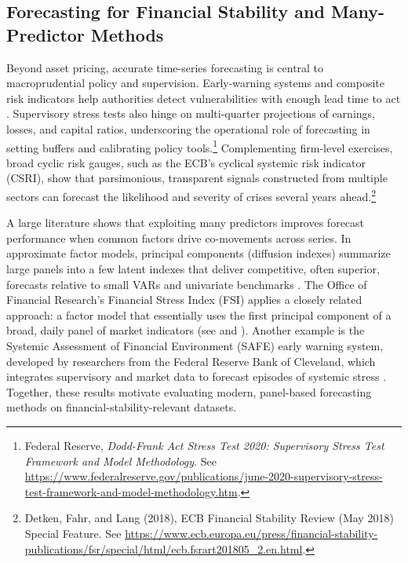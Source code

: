 \documentclass{article}
\begin{document}
\subsection{Forecasting for Financial Stability and Many-Predictor Methods}

Beyond asset pricing, accurate time-series forecasting is central to macroprudential policy and supervision. Early-warning systems and composite risk indicators help authorities detect vulnerabilities with enough lead time to act \citep{Oet2011}. Supervisory stress tests also hinge on multi-quarter projections of earnings, losses, and capital ratios, underscoring the operational role of forecasting in setting buffers and calibrating policy tools.\footnote{
    Federal Reserve, \emph{Dodd-Frank Act Stress Test 2020: Supervisory Stress Test Framework and Model Methodology}. See \url{https://www.federalreserve.gov/publications/june-2020-supervisory-stress-test-framework-and-model-methodology.htm}.
}
Complementing firm-level exercises, broad cyclic risk gauges, such as the ECB's cyclical systemic risk indicator (CSRI), show that parsimonious, transparent signals constructed from multiple sectors can forecast the likelihood and severity of crises several years ahead.\footnote{
    Detken, Fahr, and Lang (2018), ECB Financial Stability Review (May 2018) Special Feature. See \url{https://www.ecb.europa.eu/press/financial-stability-publications/fsr/special/html/ecb.fsrart201805_2.en.html}.
}

A large literature shows that exploiting many predictors improves forecast performance when common factors drive co-movements across series. In approximate factor models, principal components (diffusion indexes) summarize large panels into a few latent indexes that deliver competitive, often superior, forecasts relative to small VARs and univariate benchmarks \citep{Stock2002,Stock2002a,Stock}. The Office of Financial Research's Financial Stress Index (FSI) applies a closely related approach: a factor model that essentially uses the first principal component of a broad, daily panel of market indicators (see \citet{Monin2019} and \citet{Bejarano2023}). Another example is the Systemic Assessment of Financial Environment (SAFE) early warning system, developed by researchers from the Federal Reserve Bank of Cleveland, which integrates supervisory and market data to forecast episodes of systemic stress \citep{Oet2011}. Together, these results motivate evaluating modern, panel-based forecasting methods on financial-stability-relevant datasets.
\end{document}
